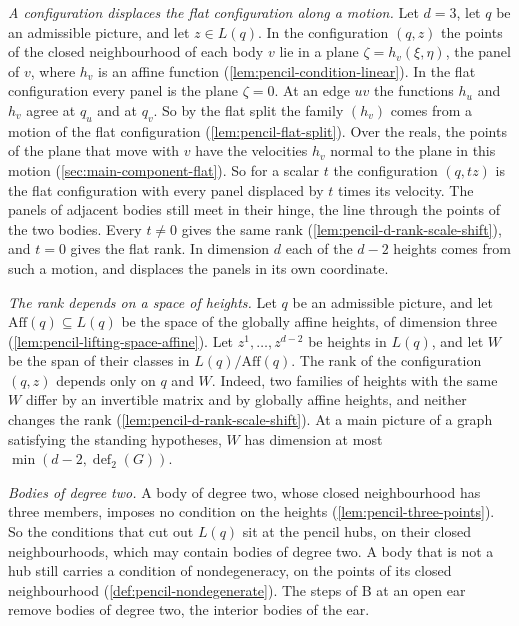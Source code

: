 \emph{A configuration displaces the flat configuration along a motion.}
Let $d = 3$, let $q$ be an admissible picture, and let $z \in L(q)$. In
the configuration $(q, z)$ the points of the closed neighbourhood of
each body $v$ lie in a plane $\zeta = h_v(\xi, \eta)$, the panel of
$v$, where $h_v$ is an affine function
(\cref{lem:pencil-condition-linear}). In the flat configuration every
panel is the plane $\zeta = 0$. At an edge $uv$ the functions $h_u$ and
$h_v$ agree at $q_u$ and at $q_v$. So by the flat split the family
$(h_v)$ comes from a motion of the flat configuration
(\cref{lem:pencil-flat-split}). Over the reals, the points of the plane
that move with $v$ have the velocities $h_v$ normal to the plane in
this motion (\cref{sec:main-component-flat}). So for a scalar $t$ the
configuration $(q, tz)$ is the flat configuration with every panel
displaced by $t$ times its velocity. The panels of adjacent bodies
still meet in their hinge, the line through the points of the two
bodies. Every $t \neq 0$ gives the same rank
(\cref{lem:pencil-d-rank-scale-shift}), and $t = 0$ gives the flat
rank. In dimension $d$ each of the $d - 2$ heights comes from such a
motion, and displaces the panels in its own coordinate.

\emph{The rank depends on a space of heights.} Let $q$ be an admissible
picture, and let $\mathrm{Aff}(q) \subseteq L(q)$ be the space of the
globally affine heights, of dimension three
(\cref{lem:pencil-lifting-space-affine}). Let $z^1, \dots, z^{d-2}$ be
heights in $L(q)$, and let $W$ be the span of their classes in
$L(q)/\mathrm{Aff}(q)$. The rank of the configuration $(q, z)$ depends
only on $q$ and $W$. Indeed, two families of heights with the same $W$
differ by an invertible matrix and by globally affine heights, and
neither changes the rank (\cref{lem:pencil-d-rank-scale-shift}). At a
main picture of a graph satisfying the standing hypotheses, $W$ has
dimension at most $\min(d - 2, \operatorname{def}_2(G))$.

\emph{Bodies of degree two.} A body of degree two, whose closed
neighbourhood has three members, imposes no condition on the heights
(\cref{lem:pencil-three-points}). So the conditions that cut out $L(q)$
sit at the pencil hubs, on their closed neighbourhoods, which may
contain bodies of degree two. A body that is not a hub still carries a
condition of nondegeneracy, on the points of its closed neighbourhood
(\cref{def:pencil-nondegenerate}). The steps of B at an open ear remove
bodies of degree two, the interior bodies of the ear.

